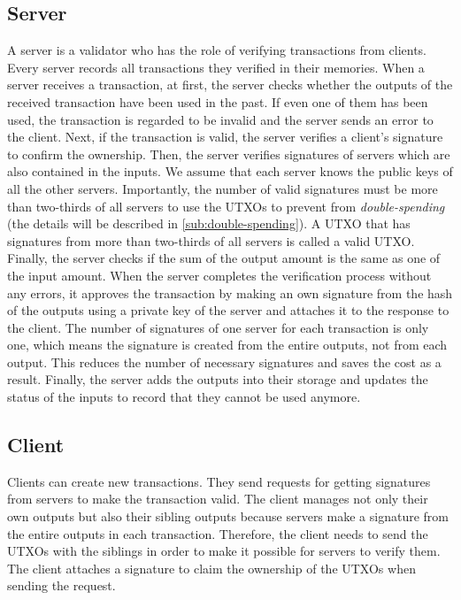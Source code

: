 \documentclass[a4paper, oneside]{discothesis}
\begin{document}
\subsection{Server}
A server is a validator who has the role of verifying transactions from clients.
Every server records all transactions they verified in their memories.
When a server receives a transaction, at first, the server checks
whether the outputs of the received transaction have been used in the past.
If even one of them has been used, the transaction is regarded to be invalid
and the server sends an error to the client.
Next, if the transaction is valid, the server verifies a client's signature
to confirm the ownership.
Then, the server verifies signatures of servers which are also contained in the inputs.
We assume that each server knows the public keys of all the other servers.
Importantly, the number of valid signatures must be more than two-thirds of all servers
to use the UTXOs to prevent from \emph{double-spending}
(the details will be described in \ref{sub:double-spending}).
A UTXO that has signatures from more than two-thirds of all servers is called a valid UTXO.
Finally, the server checks if the sum of the output amount is the same as one of
the input amount.
When the server completes the verification process without any errors,
it approves the transaction by making an own signature from the hash of the outputs
using a private key of the server and attaches it to the response to the client.
The number of signatures of one server for each transaction is only one,
which means the signature is created from the entire outputs, not from each output.
This reduces the number of necessary signatures and saves the cost as a result.
Finally, the server adds the outputs into their storage
and updates the status of the inputs to record that they cannot be used anymore.


\subsection{Client}
Clients can create new transactions.
They send requests for getting signatures from servers to make the transaction valid.
The client manages not only their own outputs but also their sibling outputs
because servers make a signature from the entire outputs in each transaction.
Therefore, the client needs to send the UTXOs with the siblings
in order to make it possible for servers to verify them.
The client attaches a signature to claim the ownership of the UTXOs when sending the request.
\end{document}
